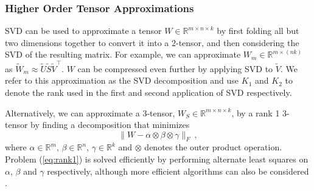 \subsubsection{Higher Order Tensor Approximations}\label{subsubsec:svd_tensor}
SVD can be used to approximate a tensor $W \in \mathbb{R}^{m \times n \times k}$
by first folding all but two dimensions together to convert it into a $2$-tensor, %
and then considering the SVD of the resulting matrix. For example, we can approximate $W_m \in \mathbb{R}^{m \times (nk)}$ as $\tilde{W}_m \approx \tilde{U}\tilde{S}\tilde{V}^{\top}$. 
$W$ can be compressed even further by applying SVD to $\tilde{V}$. We refer to this approximation as the SVD decomposition and use $K_1$ and $K_2$ to denote the rank used in the first and second application of SVD respectively.

Alternatively, we can approximate a 3-tensor, $W_S \in \mathbb{R}^{m \times n \times k}$, by a rank 1 3-tensor by finding a decomposition that minimizes 
\begin{equation}
\label{eq:rank1}
	\| W - \alpha \otimes \beta \otimes \gamma \|_F~,
\end{equation} 
where $\alpha \in \mathbb{R}^m$, $\beta \in \mathbb{R}^{n}$, $\gamma \in \mathbb{R}^k$ and $\otimes$ denotes the outer product operation.
Problem (\ref{eq:rank1}) is solved efficiently by performing alternate least squares 
on $\alpha$, $\beta$ and $\gamma$ respectively, although more efficient algorithms can also be 
considered \cite{rankonetensors}. 

